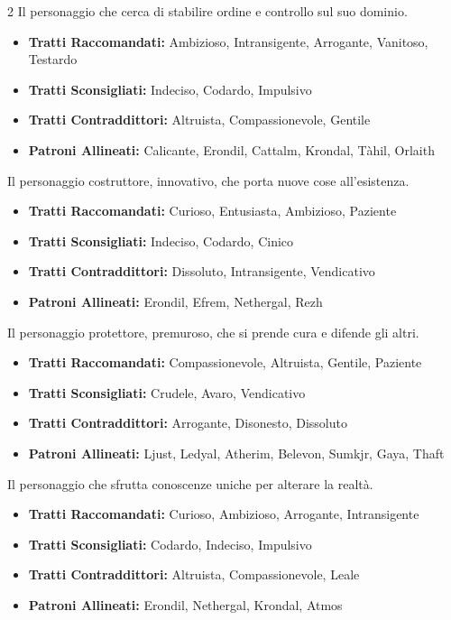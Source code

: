 \begin{multicols}{2}
Il personaggio che cerca di stabilire ordine e controllo sul suo dominio.

\noindent\begin{itemize}[leftmargin=*] \setlength{\itemsep}{0pt}
\item \textbf{Tratti Raccomandati:} Ambizioso, Intransigente, Arrogante, Vanitoso, Testardo
\item \textbf{Tratti Sconsigliati:} Indeciso, Codardo, Impulsivo
\item \textbf{Tratti Contraddittori:} Altruista, Compassionevole, Gentile
\item \textbf{Patroni Allineati:} Calicante, Erondil, Cattalm, Krondal, Tàhil, Orlaith
\end{itemize}

Il personaggio costruttore, innovativo, che porta nuove cose all'esistenza.

\noindent\begin{itemize}[leftmargin=*] \setlength{\itemsep}{0pt}
\item \textbf{Tratti Raccomandati:} Curioso, Entusiasta, Ambizioso, Paziente
\item \textbf{Tratti Sconsigliati:} Indeciso, Codardo, Cinico
\item \textbf{Tratti Contraddittori:} Dissoluto, Intransigente, Vendicativo
\item \textbf{Patroni Allineati:} Erondil, Efrem, Nethergal, Rezh
\end{itemize}

Il personaggio protettore, premuroso, che si prende cura e difende gli altri.

\noindent\begin{itemize}[leftmargin=*] \setlength{\itemsep}{0pt}
\item \textbf{Tratti Raccomandati:} Compassionevole, Altruista, Gentile, Paziente
\item \textbf{Tratti Sconsigliati:} Crudele, Avaro, Vendicativo
\item \textbf{Tratti Contraddittori:} Arrogante, Disonesto, Dissoluto
\item \textbf{Patroni Allineati:} Ljust, Ledyal, Atherim, Belevon, Sumkjr, Gaya, Thaft
\end{itemize}

Il personaggio che sfrutta conoscenze uniche per alterare la realtà.

\noindent\begin{itemize}[leftmargin=*] \setlength{\itemsep}{0pt}
\item \textbf{Tratti Raccomandati:} Curioso, Ambizioso, Arrogante, Intransigente
\item \textbf{Tratti Sconsigliati:} Codardo, Indeciso, Impulsivo
\item \textbf{Tratti Contraddittori:} Altruista, Compassionevole, Leale
\item \textbf{Patroni Allineati:} Erondil, Nethergal, Krondal, Atmos
\end{itemize}


\end{multicols}
